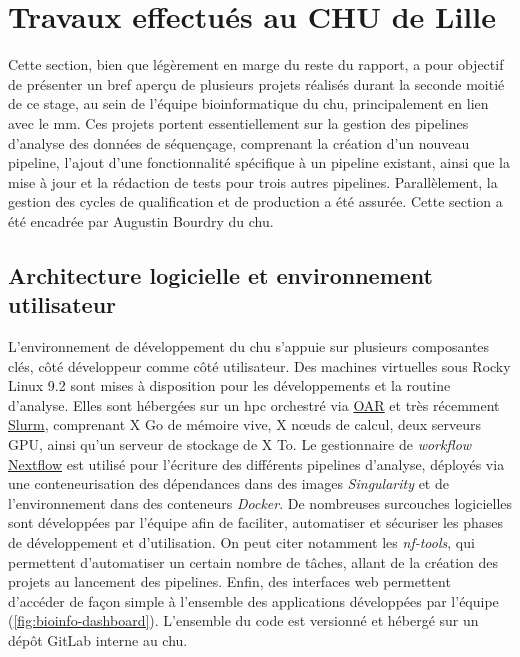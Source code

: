 \chapter{Travaux effectués au CHU de Lille}

Cette section, bien que légèrement en marge du reste du rapport, a pour objectif de présenter un bref aperçu 
de plusieurs projets réalisés durant la seconde moitié de ce stage, au sein de l'équipe bioinformatique du \gls{chu}, 
principalement en lien avec le \gls{mm}. Ces projets portent essentiellement sur la gestion des pipelines d'analyse 
des données de séquençage, comprenant la création d'un nouveau pipeline, l'ajout d'une fonctionnalité spécifique à 
un pipeline existant, ainsi que la mise à jour et la rédaction de tests pour trois autres pipelines. Parallèlement, 
la gestion des cycles de qualification et de production a été assurée. Cette section a été encadrée par Augustin Bourdry du \gls{chu}.

\section{Architecture logicielle et environnement utilisateur}

L'environnement de développement du \gls{chu} s'appuie sur plusieurs composantes clés, côté développeur comme côté utilisateur.
Des machines virtuelles sous Rocky Linux 9.2 sont mises à disposition pour les développements et la routine d'analyse.
Elles sont hébergées sur un \gls{hpc} orchestré via \href{https://oar.imag.fr/}{OAR} et très récemment \href{https://slurm.schedmd.com/documentation.html}{Slurm},  
comprenant X Go de mémoire vive, X nœuds de calcul, deux serveurs GPU, ainsi qu'un serveur de stockage de X To.
Le gestionnaire de \textit{workflow} \href{https://www.nextflow.io/}{Nextflow} est utilisé pour l'écriture des différents pipelines d'analyse, 
déployés via une conteneurisation des dépendances dans des images \textit{Singularity} et de l'environnement dans des conteneurs \textit{Docker}.
De nombreuses surcouches logicielles sont développées par l'équipe afin de faciliter, automatiser et sécuriser les phases de développement et d'utilisation.
On peut citer notamment les \textit{nf-tools}, qui permettent d'automatiser un certain nombre de tâches, allant de la création des projets au lancement des pipelines.
Enfin, des interfaces web permettent d'accéder de façon simple à l'ensemble des applications développées par l'équipe (\autoref{fig:bioinfo-dashboard}).
L'ensemble du code est versionné et hébergé sur un dépôt GitLab interne au \gls{chu}.

